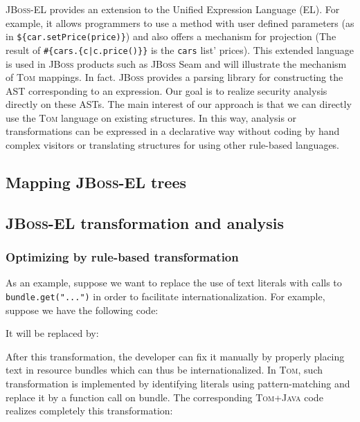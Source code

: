 \documentclass[runningheads]{llncs}
\newcommand{\jbossel}{\textsc{JBoss-EL}}
\newcommand{\jboss}{\textsc{JBoss}}
\newcommand{\tom}{\textsc{Tom}}
\newcommand{\java}{\textsc{Java}}
\begin{document}
{\jbossel} provides an extension to the Unified Expression Language (EL). For
example, it allows programmers to use a method with user defined parameters (as
    in \verb+${car.setPrice(price)}+) and also offers a mechanism for
projection (The result of \verb+#{cars.{c|c.price()}}+ is the \verb+cars+ list'
    prices).  This extended language is used in {\jboss} products such as
{\jboss} Seam and will illustrate the mechanism of {\tom} mappings. In fact.
{\jboss} provides a parsing library for constructing the AST corresponding to
an expression. Our goal is to realize security analysis directly on these ASTs.
The main interest of our approach is that we can directly use the {\tom}
language on existing structures. In this way, analysis or transformations can
be expressed in a declarative way without coding by hand complex visitors or
translating structures for using other rule-based languages.

\subsection{Mapping {\jbossel} trees}


\subsection{{\jbossel} transformation and analysis}

\subsubsection{Optimizing by rule-based transformation}

As an example, suppose we want to replace the use of text literals with calls
to \verb+bundle.get("...")+ in order to facilitate internationalization. For
example, suppose we have the following code:


It will be replaced by:

\begin{el}
${cars.getRowCount()} ${bundle.get("Cars' total price"}} =
    $ ${cars.getTotalPrice()}
\end{el}

After this transformation, the developer can fix it manually by properly
placing text in resource bundles which can thus be internationalized.
In {\tom}, such transformation is implemented by identifying literals using
pattern-matching and replace it by a function call on bundle. The corresponding
{\tom}+{\java} code realizes completely this transformation:
\end{document}
